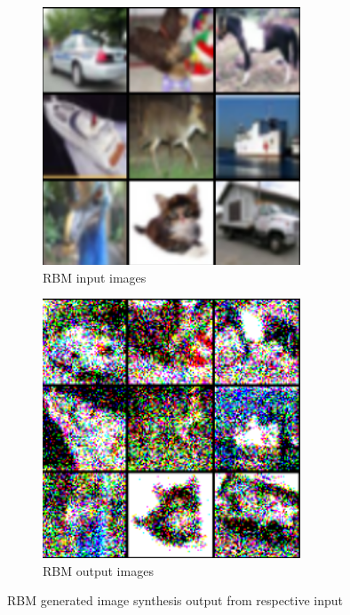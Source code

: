 \documentclass[%
 reprint,
 amsmath,amssymb,
 aps,
]{revtex4-2}
\begin{document}
\begin{figure}[h]
    \begin{subfigure}{\columnwidth}
        \centering
        \includegraphics[width=.8\linewidth]{rbmin.png}
        \caption{RBM input images}
        \label{fig:rbmin}
    \end{subfigure}
    \hfill
    \begin{subfigure}{\columnwidth}
        \centering
        \includegraphics[width=.8\linewidth]{rbmout.png}
        \caption{RBM output images}
        \label{fig:rbmout}
    \end{subfigure}
    \caption{RBM generated image synthesis output from respective input}
    \label{fig:rbmresults}
\end{figure}
\end{document}
